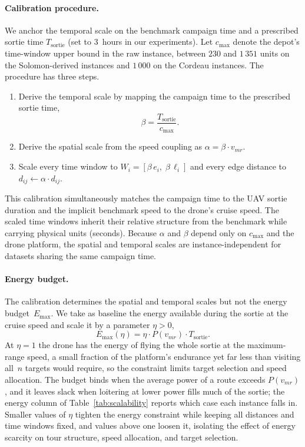 \documentclass[11pt]{article}
\begin{document}
\paragraph{Calibration procedure.}
We anchor the temporal scale on the benchmark campaign time and a prescribed sortie time $T_{\mathrm{sortie}}$ (set to 3~hours in our experiments). Let $c_{\max}$ denote the depot's time-window upper bound in the raw instance, between $230$ and $1\,351$ units on the Solomon-derived instances and $1\,000$ on the Cordeau instances. The procedure has three steps.
\begin{enumerate}[noitemsep, topsep=0pt]
    \item Derive the temporal scale by mapping the campaign time to the prescribed sortie time,
    \[
        \beta = \frac{T_{\mathrm{sortie}}}{c_{\max}}.
    \]
    \item Derive the spatial scale from the speed coupling as $\alpha = \beta \cdot v_{mr}$.
    \item Scale every time window to $W_i = [\beta\, e_i,\; \beta\, \ell_i]$ and every edge distance to $d_{ij} \leftarrow \alpha \cdot d_{ij}$.
\end{enumerate}

This calibration simultaneously matches the campaign time to the UAV sortie duration and the implicit benchmark speed to the drone's cruise speed. The scaled time windows inherit their relative structure from the benchmark while carrying physical units (seconds). Because $\alpha$ and $\beta$ depend only on $c_{\max}$ and the drone platform, the spatial and temporal scales are instance-independent for datasets sharing the same campaign time.


\paragraph{Energy budget.}
The calibration determines the spatial and temporal scales but not the energy budget~$E_{\max}$. We take as baseline the energy available during the sortie at the cruise speed and scale it by a parameter $\eta > 0$,
\[
    E_{\max}(\eta) = \eta \cdot P(v_{mr}) \cdot T_{\mathrm{sortie}}.
\]
At $\eta = 1$ the drone has the energy of flying the whole sortie at the maximum-range speed, a small fraction of the platform's endurance yet far less than visiting all~$n$ targets would require, so the constraint limits target selection and speed allocation. The budget binds when the average power of a route exceeds $P(v_{mr})$, and it leaves slack when loitering at lower power fills much of the sortie; the energy column of Table~\ref{tab:scalability} reports which case each instance falls in. Smaller values of $\eta$ tighten the energy constraint while keeping all distances and time windows fixed, and values above one loosen it, isolating the effect of energy scarcity on tour structure, speed allocation, and target selection.
\end{document}
